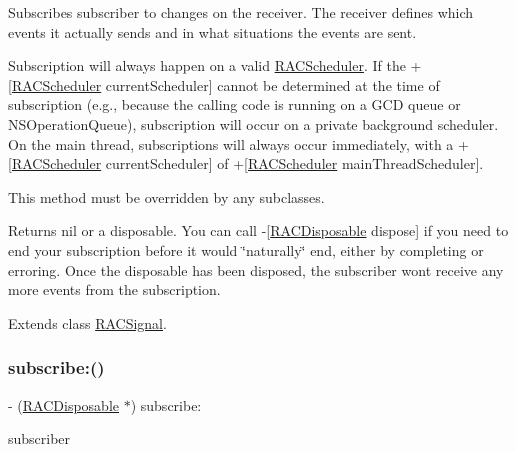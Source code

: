 Subscribes {\ttfamily subscriber} to changes on the receiver. The receiver defines which events it actually sends and in what situations the events are sent.

Subscription will always happen on a valid \mbox{\hyperlink{interface_r_a_c_scheduler}{R\+A\+C\+Scheduler}}. If the +\mbox{[}\mbox{\hyperlink{interface_r_a_c_scheduler}{R\+A\+C\+Scheduler}} current\+Scheduler\mbox{]} cannot be determined at the time of subscription (e.\+g., because the calling code is running on a G\+CD queue or N\+S\+Operation\+Queue), subscription will occur on a private background scheduler. On the main thread, subscriptions will always occur immediately, with a +\mbox{[}\mbox{\hyperlink{interface_r_a_c_scheduler}{R\+A\+C\+Scheduler}} current\+Scheduler\mbox{]} of +\mbox{[}\mbox{\hyperlink{interface_r_a_c_scheduler}{R\+A\+C\+Scheduler}} main\+Thread\+Scheduler\mbox{]}.

This method must be overridden by any subclasses.

Returns nil or a disposable. You can call -\/\mbox{[}\mbox{\hyperlink{interface_r_a_c_disposable}{R\+A\+C\+Disposable}} dispose\mbox{]} if you need to end your subscription before it would \char`\"{}naturally\char`\"{} end, either by completing or erroring. Once the disposable has been disposed, the subscriber won\textquotesingle{}t receive any more events from the subscription. 

Extends class \mbox{\hyperlink{interface_r_a_c_signal_aeab76d632d98bbc321ec5e19575377eb}{R\+A\+C\+Signal}}.

\mbox{\label{category_r_a_c_signal_07_subscription_08_aeab76d632d98bbc321ec5e19575377eb}} 
\subsubsection{\texorpdfstring{subscribe\+:()}{subscribe:()}\hspace{0.1cm}{\footnotesize\ttfamily [2/3]}}
{\footnotesize\ttfamily -\/ (\mbox{\hyperlink{interface_r_a_c_disposable}{R\+A\+C\+Disposable}} $\ast$) subscribe\+: \begin{DoxyParamCaption}\item[{(id$<$\mbox{\hyperlink{interface_r_a_c_subscriber}{R\+A\+C\+Subscriber}}$>$)}]{subscriber }\end{DoxyParamCaption}}

